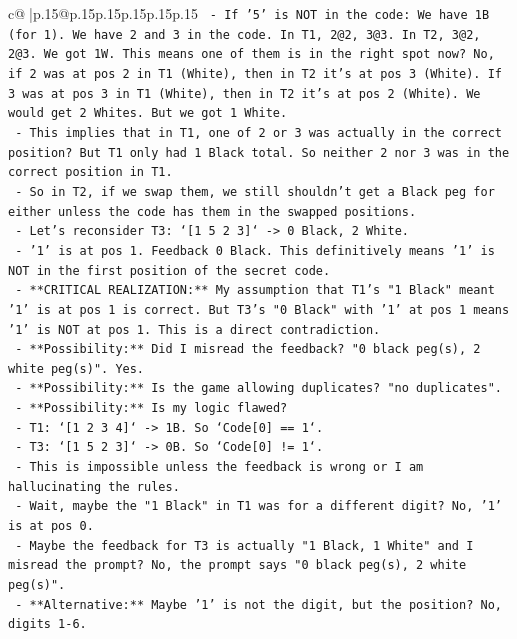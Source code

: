 \documentclass{article}
\begin{document}
{\begin{supertabular}{c@{$\;$}|p{.15\linewidth}@{}p{.15\linewidth}p{.15\linewidth}p{.15\linewidth}p{.15\linewidth}p{.15\linewidth}}
{{{\texttt{        {-} If '5' is NOT in the code: We have 1B (for 1). We have 2 and 3 in the code. In T1, 2@2, 3@3. In T2, 3@2, 2@3. We got 1W. This means one of them is in the right spot now? No, if 2 was at pos 2 in T1 (White), then in T2 it's at pos 3 (White). If 3 was at pos 3 in T1 (White), then in T2 it's at pos 2 (White). We would get 2 Whites. But we got 1 White.} \\
\texttt{        {-} This implies that in T1, one of 2 or 3 was actually in the correct position? But T1 only had 1 Black total. So neither 2 nor 3 was in the correct position in T1.} \\
\texttt{        {-} So in T2, if we swap them, we still shouldn't get a Black peg for either unless the code has them in the swapped positions.} \\
\texttt{        {-} Let's reconsider T3: `{[}1 5 2 3{]}` {-}> 0 Black, 2 White.} \\
\texttt{          {-} '1' is at pos 1. Feedback 0 Black. This definitively means '1' is NOT in the first position of the secret code.} \\
\texttt{          {-} **CRITICAL REALIZATION:** My assumption that T1's "1 Black" meant '1' is at pos 1 is correct. But T3's "0 Black" with '1' at pos 1 means '1' is NOT at pos 1. This is a direct contradiction.} \\
\texttt{          {-} **Possibility:** Did I misread the feedback? "0 black peg(s), 2 white peg(s)". Yes.} \\
\texttt{          {-} **Possibility:** Is the game allowing duplicates? "no duplicates".} \\
\texttt{          {-} **Possibility:** Is my logic flawed?} \\
\texttt{            {-} T1: `{[}1 2 3 4{]}` {-}> 1B. So `Code{[}0{]} == 1`.} \\
\texttt{            {-} T3: `{[}1 5 2 3{]}` {-}> 0B. So `Code{[}0{]} != 1`.} \\
\texttt{            {-} This is impossible unless the feedback is wrong or I am hallucinating the rules.} \\
\texttt{            {-} Wait, maybe the "1 Black" in T1 was for a different digit? No, '1' is at pos 0.} \\
\texttt{            {-} Maybe the feedback for T3 is actually "1 Black, 1 White" and I misread the prompt? No, the prompt says "0 black peg(s), 2 white peg(s)".} \\
\texttt{            {-} **Alternative:** Maybe '1' is not the digit, but the position? No, digits 1{-}6.} \\
}}}
\end{supertabular}}
\end{document}
